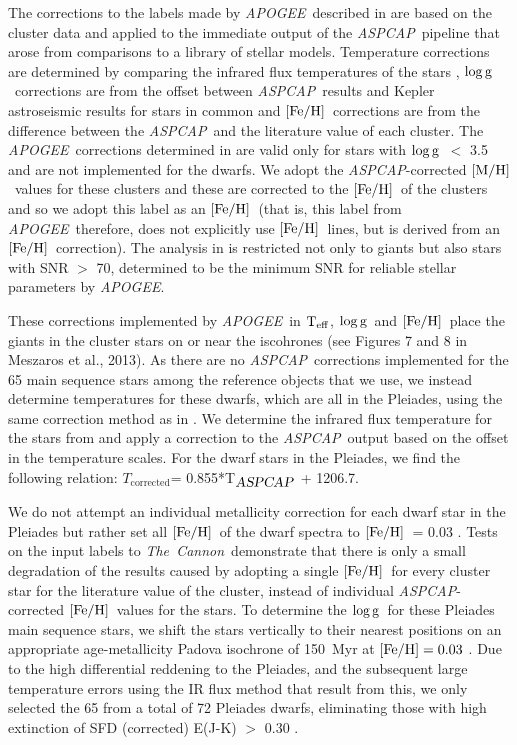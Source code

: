 \documentclass[12pt, preprint]{aastex}
\newcommand{\tc}{\textsl{The~Cannon}}
\newcommand{\apogee}{\textsl{APOGEE}}
\newcommand{\aspcap}{\textsl{ASPCAP}}
\newcommand{\teff}{\mbox{$\rm T_{eff}$}}
\newcommand{\feh}{\mbox{$\rm [Fe/H]$}}
\newcommand{\mh}{\mbox{$\rm [M/H]$}}
\newcommand{\logg}{\mbox{$\rm \log g$}}
\begin{document}
The corrections to the labels made by \apogee\ described in \citet{Meszaros2013} are based on the cluster data and applied to the immediate output of the \aspcap\ pipeline that arose from comparisons to a library of stellar models.
Temperature corrections are determined by comparing the infrared flux temperatures of the stars \citep{gonzalez2009}, \logg\ corrections are from the offset between \aspcap\ results and Kepler astroseismic results for stars in common and \feh\ corrections are from the difference between the \aspcap\ and  the literature value of each cluster.  
The \apogee\ corrections determined in \citet{Meszaros2013} are valid only for stars with \logg\ $<$ 3.5 and are not implemented for the dwarfs.  We adopt the \aspcap-corrected \mh\ values for these clusters and these are corrected to the \feh\ of the clusters and so we adopt this label as an \feh\ (that is, this label from \apogee\ therefore, does not explicitly use \feh\ lines, but is derived from an \feh\ correction). 
The analysis in \citet{Meszaros2013} is restricted not only to giants but also stars with SNR $>$ 70, determined to be the minimum SNR for reliable stellar parameters by \apogee.

These corrections implemented by \apogee\ in \teff, \logg\ and  \feh\ place the giants in the cluster stars on or near the iscohrones (see Figures 7 and 8 in Meszaros et al., 2013).  
As there are no \aspcap\ corrections implemented for the 65 main sequence stars among the reference objects that we use, 
we instead determine temperatures for these dwarfs, which are all in the Pleiades, using the same correction method 
as in \citet{Meszaros2013}. 
We determine the infrared flux temperature for the stars from \citet{gonzalez2009} and apply a correction to 
the \aspcap\ output based on the offset in the temperature scales. For the dwarf stars in the Pleiades, we find the following relation:
 $T_{\mbox{corrected}}$= 0.855*T$_{\mbox{\textit{\aspcap}}}$ + 1206.7.

We do not attempt an individual metallicity correction for each dwarf star in the Pleiades but rather set all \feh\ of the dwarf spectra to \feh\ = 0.03 \citep{barrado2001}.
Tests on the input labels to \tc\ demonstrate that there is only a small degradation of the results caused by adopting a single \feh\ for every cluster star for the literature value of the cluster, instead of individual \aspcap-corrected \feh\ values for the stars.
To determine the \logg\ for these Pleiades main sequence stars, we shift the stars vertically to their nearest positions on an appropriate age-metallicity Padova isochrone of 150~Myr at $\feh = 0.03$ \citep{girardi2000}. 
Due to the high differential reddening to the Pleiades, and the subsequent large temperature errors using the IR flux method that result from this, we only selected the 65 from a total of 72 Pleiades dwarfs, eliminating those with high extinction of SFD (corrected) E(J-K) $>$ 0.30 \citep{Schlafly2011}.
\end{document}
